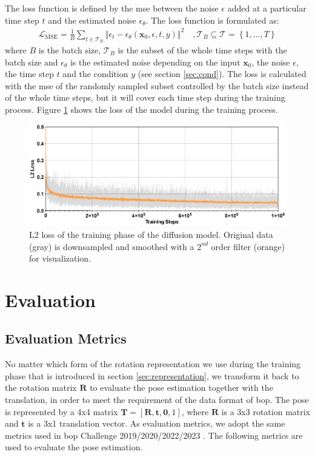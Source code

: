 \documentclass[12pt,DIV14,BCOR12mm,a4paper,footinclude=false,headinclude,parskip=half-,twoside,openright,cleardoublepage=empty,toc=index,bibliography=totoc,listof=totoc]{scrreprt}
\numberwithin{equation}{chapter}
\begin{document}
The loss function is defined by the \gls{mse} between the noise $\epsilon$ added at a particular time step $t$ and the estimated noise $\epsilon_{\theta}$. The loss function is formulated as:
\begin{align}
  \mathcal{L}_{\text{MSE}}=\frac{1}{B}\sum_{t\in \mathcal{T}_{B} }\left\Vert \epsilon_{t}-\epsilon_{\theta}(\mathbf{x}_{0},\epsilon, t, y)\right\Vert^{2} \quad , \mathcal{T}_{B}\subseteq \mathcal{T}=\left\{1,\dots,T\right\}
\end{align}
where $B$ is the batch size, $\mathcal{T}_{B}$ is the subset of the whole time steps with the batch size and $\epsilon_{\theta}$ is the estimated noise depending on the input $\mathbf{x}_{0}$, the noise $\epsilon$, the time step $t$ and the condition $y$ (see section \ref{sec:cond}). The loss is calculated with the \gls{mse} of the randomly sampled subset controlled by the batch size instead of the whole time steps, but it will cover each time step during the training process. Figure \ref{img:diff_loss} shows the loss of the model during the training process.

\begin{figure}[h]
	\centering
	\includegraphics[width=1.\textwidth]{img/diff_loss.eps}
	\caption{L2 loss of the training phase of the diffusion model. Original data (gray) is downsampled and smoothed with a $2^{nd}$ order filter (orange) for visualization. }
	\label{img:diff_loss}
\end{figure}

\section{Evaluation}
\subsection{Evaluation Metrics}
No matter which form of the rotation representation we use during the training phase that is introduced in section \ref{sec:representation}, we transform it back to the rotation matrix $\mathbf{R}$ to evaluate the pose estimation together with the translation, in order to meet the requirement of the data format of \gls{bop}. The pose is represented by a 4x4 matrix $\mathbf{T}=[\mathbf{R},\mathbf{t},\mathbf{0},1]$, where $\mathbf{R}$ is a 3x3 rotation matrix and $\mathbf{t}$ is a 3x1 translation vector. As evaluation metrics, we adopt the same metrics used in \gls{bop} Challenge 2019/2020/2022/2023 \cite{hodan2018bop,hodan2020bop}. The following metrics are used to evaluate the pose estimation. 
\end{document}
